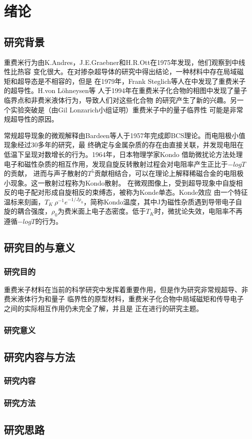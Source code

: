 
\section{绪论}
\subsection{研究背景}
重费米行为由K.Andres，J.E.Graebner和H.R.Ott在1975年发现，他们观察到中线性比热容
变化很大。在对掺杂超导体的研究中得出结论，一种材料中存在局域磁矩和超导态是不相容的，但是
在1979年，Frank Steglich等人在中发现了重费米子的超导性。H.von Löhneysen等
人于1994年在重费米子化合物的相图中发现了量子临界点和非费米液体行为，导致人们对这些化合物
的研究产生了新的兴趣。另一个实验突破是（由Gil Lonzarich小组证明）重费米子中的量子临界性
可能是非常规超导性的原因。

常规超导现象的微观解释由Bardeen等人于1957年完成即BCS理论。而电阻极小值现象经过30多年的研究，最
终确定与金属杂质的存在由直接关联，并发现电阻在低温下呈现对数增长的行为。1964年，日本物理学家Kondo
借助微扰论方法处理电子和磁性杂质的相互作用，发现自旋反转散射过程会对电阻率产生正比于$-logT$的贡献，
进而与声子散射的$T^5$贡献相结合，可以在理论上解释稀磁合金的电阻极小现象。这一散射过程称为Kondo散射。
在微观图像上，受到超导现象中自旋相反的电子配对形成自旋相反的束缚态，被称为Konde单态。Konde效应
由一个特征温标来刻画，$T_K ~ \rho^{-1}e^{-1/J \rho_0}$，简称Kondo温度，其中J为磁性杂质遇到导带电子自旋的耦合强度，$\rho_0$为费米面上电子态密度。低于$T_K$时，微扰论失效，电阻率不再遵循$-logT$的行为。



\subsection{研究目的与意义}
\subsubsection{研究目的}
重费米子材料在当前的科学研究中发挥着重要作用，但是作为研究非常规超导、非费米液体行为和量子
临界性的原型材料，重费米子化合物中局域磁矩和传导电子之间的实际相互作用仍未完全了解，并且是
正在进行的研究主题。

\subsubsection{研究意义}



\subsection{研究内容与方法}



\subsubsection{研究内容}


\subsubsection{研究方法}


\subsection{研究思路}
